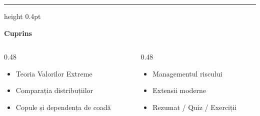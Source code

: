 \documentclass[9pt, aspectratio=169, t]{beamer}
\theoremstyle{definition}
\begin{document}
{
\begin{frame}{}
    {\color{FooterGray}\hrule height 0.4pt}
    \vspace{0.1cm}
    {\Large\textcolor{IDAred}{\textbf{Cuprins}}}
    \vspace{0.2cm}
    {\small
    \begin{columns}[T]
        \begin{column}{0.48\textwidth}
            \begin{itemize}
                \item Teoria Valorilor Extreme \checkmark
                \item Comparația distribuțiilor \checkmark
                \item Copule și dependența de coadă \checkmark
            \end{itemize}
        \end{column}
        \begin{column}{0.48\textwidth}
            \begin{itemize}
                \item Managementul riscului \checkmark
                \item Extensii moderne \checkmark
                \item Rezumat / Quiz / Exerciții \checkmark
            \end{itemize}
        \end{column}
    \end{columns}
    }
\end{frame}
}
\end{document}
